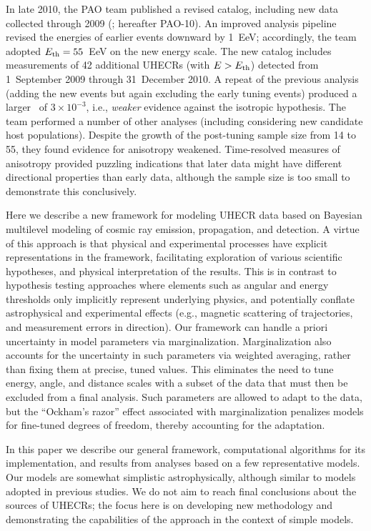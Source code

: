 
In late 2010, the PAO team published a revised catalog, including new data
collected through 2009 (\cite{PAO10-AnisoUpdate}; hereafter PAO-10).  An
improved analysis pipeline revised the energies of earlier events downward
by 1~EeV; accordingly, the team adopted $E_{\rm th} = 55$~EeV on the new energy
scale.  The new catalog includes measurements of 42 additional UHECRs (with
$E>E_{\rm th}$) detected from 1~September 2009 through 31~December 2010.  A repeat
of the previous analysis (adding the new events but again excluding the
early tuning events) produced a larger \pval\ of $3\times 10^{-3}$, i.e.,
{\em weaker} evidence against the isotropic hypothesis.  The team performed
a number of other analyses (including considering new candidate host
populations).  Despite the growth of the post-tuning sample size from 14 to
55, they found evidence for anisotropy weakened.  Time-resolved measures of
anisotropy provided puzzling indications that later data might have
different directional properties than early data, although the sample size
is too small to demonstrate this conclusively.

Here we describe a new framework for modeling UHECR data based on Bayesian
multilevel modeling of cosmic ray emission, propagation, and detection.
A virtue of this approach is that physical and experimental
processes have explicit representations in the framework, facilitating
exploration of various scientific hypotheses, and physical interpretation of
the results.  This is in contrast to
hypothesis testing approaches where elements such as angular and energy
thresholds only implicitly represent underlying physics, and potentially
conflate astrophysical and experimental effects (e.g., magnetic scattering
of trajectories, and measurement errors in direction).
Our framework can
handle a priori uncertainty in model parameters via marginalization. 
Marginalization also accounts for the uncertainty in such parameters via
weighted averaging, rather than fixing them at precise, tuned values.  This
eliminates the need to tune energy, angle, and distance scales with a subset
of the data that must then be excluded from a final analysis.  Such parameters
are allowed to adapt to the data, but the ``Ockham's razor'' effect associated
with marginalization penalizes models for fine-tuned degrees of freedom,
thereby accounting for the adaptation.

In this paper we describe our general framework, computational algorithms
for its implementation, and results from analyses based on a few
representative models.  Our models are somewhat simplistic astrophysically,
although similar to models adopted in previous studies.  We do not aim to
reach final conclusions about the sources of UHECRs; the focus here is on
developing new methodology and demonstrating the capabilities of the
approach in the context of simple models.

